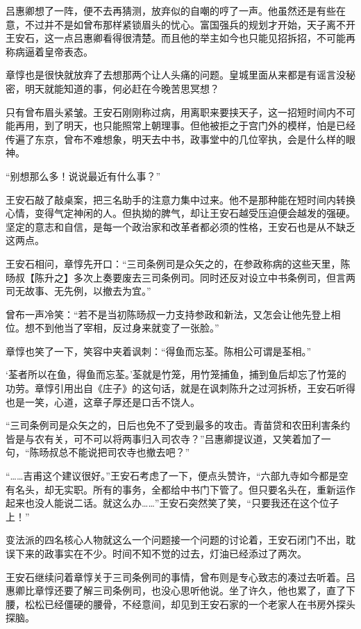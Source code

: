 吕惠卿想了一阵，便不去再猜测，放弃似的自嘲的哼了一声。他虽然还是有些在意，不过并不是如曾布那样紧锁眉头的忧心。富国强兵的规划才开始，天子离不开王安石，这一点吕惠卿看得很清楚。而且他的举主如今也只能见招拆招，不可能再称病逼着皇帝表态。

章惇也是很快就放弃了去想那两个让人头痛的问题。皇城里面从来都是有谣言没秘密，明天就能知道的事，何必赶在今晚苦思冥想？

只有曾布眉头紧皱。王安石刚刚称过病，用离职来要挟天子，这一招短时间内不可能再用，到了明天，也只能照常上朝理事。但他被拒之于宫门外的模样，怕是已经传遍了东京，曾布不难想象，明天去中书，政事堂中的几位宰执，会是什么样的眼神。

“别想那么多！说说最近有什么事？”

王安石敲了敲桌案，把三名助手的注意力集中过来。他不是那种能在短时间内转换心情，变得气定神闲的人。但执拗的脾气，却让王安石越受压迫便会越发的强硬。坚定的意志和自信，是每一个政治家和改革者都必须的性格，王安石也是从不缺乏这两点。

王安石相问，章惇先开口：“三司条例司是众矢之的，在参政称病的这些天里，陈旸叔【陈升之】多次上奏要废去三司条例司。同时还反对设立中书条例司，但言两司无故事、无先例，以撤去为宜。”

曾布一声冷笑：“若不是当初陈旸叔一力支持参政和新法，又怎会让他先登上相位。想不到他当了宰相，反过身来就变了一张脸。”

章惇也笑了一下，笑容中夹着讽刺：“得鱼而忘荃。陈相公可谓是荃相。”

‘荃者所以在鱼，得鱼而忘荃。’荃就是竹笼，用竹笼捕鱼，捕到鱼后却忘了竹笼的功劳。章惇引用出自《庄子》的这句话，就是在讽刺陈升之过河拆桥，王安石听得也是一笑，心道，这章子厚还是口舌不饶人。

“三司条例司是众矢之的，日后也免不了受到最多的攻击。青苗贷和农田利害条约皆是与农有关，可不可以将两事归入司农寺？”吕惠卿提议道，又笑着加了一句，“陈旸叔总不能说把司农寺也撤去吧？”

“……吉甫这个建议很好。”王安石考虑了一下，便点头赞许，“六部九寺如今都是空有名头，却无实职。所有的事务，全都给中书门下管了。但只要名头在，重新运作起来也没人能说二话。就这么办……”王安石突然笑了笑，“只要我还在这个位子上！”

变法派的四名核心人物就这么一个问题接一个问题的讨论着，王安石闭门不出，耽误下来的政事实在不少。时间不知不觉的过去，灯油已经添过了两次。

王安石继续问着章惇关于三司条例司的事情，曾布则是专心致志的凑过去听着。吕惠卿比章惇还要了解三司条例司，也没心思听他说。坐了许久，他也累了，直了下腰，松松已经僵硬的腰骨，不经意间，却见到王安石家的一个老家人在书房外探头探脑。


